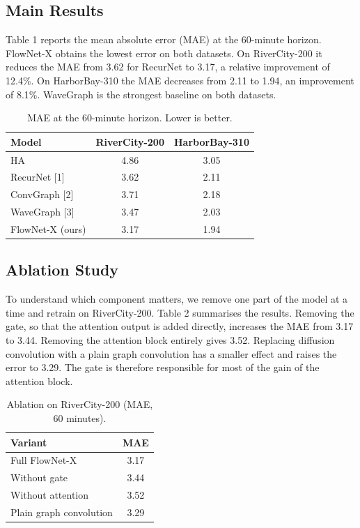 \documentclass[10pt,twocolumn]{article}
\begin{document}
\subsection{Main Results}
Table 1 reports the mean absolute error (MAE) at the 60-minute horizon. FlowNet-X obtains the lowest error on both datasets. On RiverCity-200 it reduces the MAE from 3.62 for RecurNet to 3.17, a relative improvement of 12.4\%. On HarborBay-310 the MAE decreases from 2.11 to 1.94, an improvement of 8.1\%. WaveGraph is the strongest baseline on both datasets.

\begin{table}[h]
\centering
\caption{MAE at the 60-minute horizon. Lower is better.}
\begin{tabular}{lcc}
\toprule
Model & RiverCity-200 & HarborBay-310 \\
\midrule
HA & 4.86 & 3.05 \\
RecurNet [1] & 3.62 & 2.11 \\
ConvGraph [2] & 3.71 & 2.18 \\
WaveGraph [3] & 3.47 & 2.03 \\
FlowNet-X (ours) & 3.17 & 1.94 \\
\bottomrule
\end{tabular}
\end{table}

\subsection{Ablation Study}
To understand which component matters, we remove one part of the model at a time and retrain on RiverCity-200. Table 2 summarises the results. Removing the gate, so that the attention output is added directly, increases the MAE from 3.17 to 3.44. Removing the attention block entirely gives 3.52. Replacing diffusion convolution with a plain graph convolution has a smaller effect and raises the error to 3.29. The gate is therefore responsible for most of the gain of the attention block.

\begin{table}[h]
\centering
\caption{Ablation on RiverCity-200 (MAE, 60 minutes).}
\begin{tabular}{lc}
\toprule
Variant & MAE \\
\midrule
Full FlowNet-X & 3.17 \\
Without gate & 3.44 \\
Without attention & 3.52 \\
Plain graph convolution & 3.29 \\
\bottomrule
\end{tabular}
\end{table}
\end{document}
